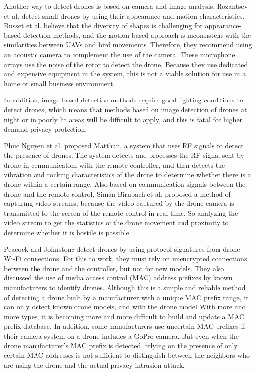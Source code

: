 \documentclass{sig-alternate-10pt}
\begin{document}
\hspace{1mm} 
Another way to detect drones is based on camera and image analysis. Rozantsev et al. detect small drones by using their appearance and motion characteristics. Busset et al. believe that the diversity of  shapes is challenging for appearance-based detection methods, and the motion-based approach is inconsistent with the similarities between UAVs and bird movements. Therefore, they recommend using an acoustic camera to complement the use of the camera. These microphone arrays use the noise of the rotor to detect the drone. Because they use dedicated and expensive equipment in the system, this is not a viable solution for use in a home or small business environment.

In addition, image-based detection methods require good lighting conditions to detect drones, which means that methods based on image detection of drones at night or in poorly lit areas will be difficult to apply, and this is  fatal for higher demand privacy protection. 

\hspace{1mm} 
Phuc Nguyen et al. proposed Matthan, a system that uses RF signals to detect the presence of drones. The system detects and processes the RF signal sent by drone in communication with the remote controller, and then detects the vibration and rocking characteristics of the drone to determine whether there is a drone within a certain range. Also based on communication signals between the drone and the remote control, Simon Birnbach et al. proposed a method of capturing video streams, because the video captured by the drone camera is transmitted to the screen of the remote control in real time. So analyzing the video stream to get the statistics of the drone movement and proximity to determine whether it is hostile is possible.

Peacock and Johnstone detect drones by using protocol signatures from drone Wi-Fi connections. For this to work, they must rely on unencrypted connections between the drone and the controller, but not for new models. They also discussed the use of media access control (MAC) address prefixes by known manufacturers to identify drones. Although this is a simple and reliable method of detecting a drone built by a manufacturer with a unique MAC prefix range, it can only detect known drone models, and with the drone model With more and more types, it is becoming more and more difficult to build and update a MAC prefix database. In addition, some manufacturers use uncertain MAC prefixes if their camera system on a drone includes a GoPro camera. But even when the drone manufacturer's MAC prefix is detected, relying on the presence of only certain MAC addresses is not sufficient to distinguish between the neighbors who are using the drone and the actual privacy intrusion attack.
\end{document}
